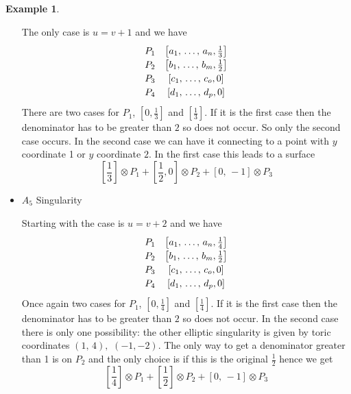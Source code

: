 \documentclass[12pt,a4paper]{book}      %
\theoremstyle{definition}
\newtheorem{ex}[thm]{Example}
\begin{document}
\begin{ex}
\begin{itemize}
The only case is $u = v+1$ and we have
\[\def\arraystretch{1.2}
\begin{array}{cc}
P_1 & \left[ a_1, \, \dots , \, a_n, \frac{1}{3} \right] \\ 
P_2 & \left[b_1 , \, \dots, \, b_m, \frac{1}{2} \right] \\
P_3 & \left[c_1, \, \dots, \, c_o, 0\right] \\
P_4 & \left[d_1, \, \dots, \, d_p, 0\right]  \\
\end{array}
\]
There are two cases for $P_1$,  $[0, \frac{1}{3}]$ and $[\frac{1}{3}]$. If it is the first case then the denominator has to be greater than $2$ so does not occur. So only the second case occurs. In the second case we can have it connecting to a point with $y$ coordinate 1 or $y$ coordinate $2$. In the first case this leads to a surface 
\[
\left[\frac{1}{3} \right] \otimes P_1 + \left[\frac{1}{2}, 0 \right] \otimes P_2 + [0, \,- 1] \otimes P_3
\]


\item \begin{bf} $A_5$ Singularity \end{bf}

Starting with the case is $u = v+2$ and we have
\[\def\arraystretch{1.2}
\begin{array}{cc}
P_1 & \left[ a_1, \, \dots , \, a_n, \frac{1}{4} \right] \\ 
P_2 & \left[b_1 , \, \dots, \, b_m, \frac{1}{2} \right] \\
P_3 & \left[c_1, \, \dots, \, c_o, 0\right] \\
P_4 & \left[d_1, \, \dots, \, d_p, 0\right]  \\
\end{array}
\]
Once again two cases for $P_1$,  $[0, \frac{1}{4}]$ and $[\frac{1}{4}]$. If it is the first case then the denominator has to be greater than $2$ so does not occur. In the second case there is only one possibility: the other elliptic singularity is given by toric coordinates $(1, \, 4),$ $(-1, -2)$. The only way to get a denominator greater than 1 is on $P_2$ and  the only choice is if this is the original $\frac{1}{2}$ hence we get
\[
\left[\frac{1}{4} \right] \otimes P_1 + \left[\frac{1}{2} \right] \otimes P_2 + [0, \, -1] \otimes P_3
\]


\end{itemize}
\end{ex}
\end{document}
